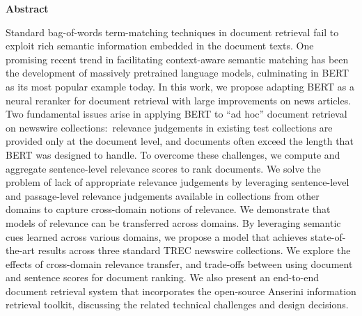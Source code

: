 \cleardoublepage

%
%  

\cleardoublepage


\begin{center}\textbf{Abstract}\end{center}
Standard bag-of-words term-matching techniques in document retrieval fail to exploit rich semantic information embedded in the document texts.
One promising recent trend in facilitating context-aware semantic matching has been the development of massively pretrained language models, culminating in BERT as its most popular example today.
In this work, we propose adapting BERT as a neural reranker for document retrieval with large improvements on news articles.
Two fundamental issues arise in applying BERT to ``ad hoc'' document retrieval on newswire collections:\
relevance judgements in existing test collections are provided only at the document level, and documents often exceed the length that BERT was designed to handle.
To overcome these challenges, we compute and aggregate sentence-level relevance scores to rank documents.
We solve the problem of lack of appropriate relevance judgements by leveraging sentence-level and passage-level relevance judgements available in collections from other domains to capture cross-domain notions of relevance.
We demonstrate that models of relevance can be transferred across domains.
By leveraging semantic cues learned across various domains, we propose a model that achieves state-of-the-art results across three standard TREC newswire collections.
We explore the effects of cross-domain relevance transfer, and trade-offs between using document and sentence scores for document ranking.
We also present an end-to-end document retrieval system that incorporates the open-source Anserini information retrieval toolkit, discussing the related technical challenges and design decisions.

\cleardoublepage


